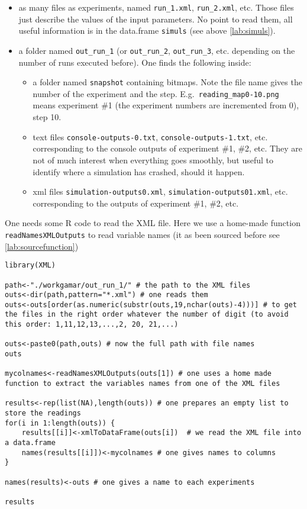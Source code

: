 \begin{itemize}
	\item as many files as experiments, named \texttt{run\_1.xml}, \texttt{run\_2.xml}, etc. Those files just describe the values of the input parameters. No point to read them, all useful information is in the data.frame \texttt{simuls} (see above \ref{lab:simuls}).
	\item a folder named \texttt{out\_run\_1} (or \texttt{out\_run\_2}, \texttt{out\_run\_3}, etc. depending on the number of runs executed before). One finds the following inside:
	\begin{itemize}
		\item a folder named  \texttt{snapshot} containing bitmaps. Note the file name gives the number of the experiment and the step. E.g.\texttt{ reading\_map0-10.png} means experiment \#1 (the experiment numbers are incremented from 0), step 10.
		\item text files \texttt{console-outputs-0.txt}, \texttt{console-outputs-1.txt}, etc. corresponding to the console outputs of experiment \#1, \#2, etc. They are not of much interest when everything goes smoothly, but useful to identify where a simulation has crashed, should it happen.
		\item xml files \texttt{simulation-outputs0.xml}, \texttt{simulation-outputs01.xml}, etc. corresponding to the outputs of experiment \#1, \#2, etc.
	\end{itemize}
\end{itemize}

One needs some R code to read the XML file. Here we use a home-made function \texttt{readNamesXMLOutputs} to read variable names (it as been sourced before see \ref{lab:sourcefunction})

\begin{lstlisting}
library(XML)

path<-"./workgamar/out_run_1/" # the path to the XML files
outs<-dir(path,pattern="*.xml") # one reads them
outs<-outs[order(as.numeric(substr(outs,19,nchar(outs)-4)))] # to get the files in the right order whatever the number of digit (to avoid this order: 1,11,12,13,...,2, 20, 21,...)

outs<-paste0(path,outs) # now the full path with file names
outs

mycolnames<-readNamesXMLOutputs(outs[1]) # one uses a home made function to extract the variables names from one of the XML files

results<-rep(list(NA),length(outs)) # one prepares an empty list to store the readings
for(i in 1:length(outs)) {
	results[[i]]<-xmlToDataFrame(outs[i])  # we read the XML file into a data.frame
	names(results[[i]])<-mycolnames # one gives names to columns
}

names(results)<-outs # one gives a name to each experiments

results

\end{lstlisting}

